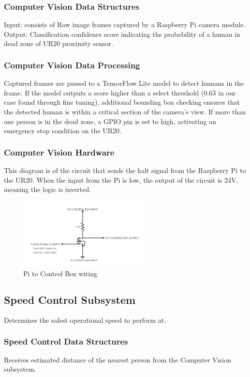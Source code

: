 \subsubsection{Computer Vision Data Structures}
Input: consists of Raw image frames captured by a Raspberry Pi camera module.
Output: Classification confidence score indicating the probability of a human in dead zone of UR20 proximity sensor.

\subsubsection{Computer Vision Data Processing}
Captured frames are passed to a TensorFlow Lite model to detect humans in the frame. If the model outputs a score higher than a select threshold (0.63 in our case found through fine tuning), additional bounding box checking ensures that the detected human is within a critical section of the camera's view. 
If more than one person is in the dead zone, a GPIO pin is set to high, activating an emergency stop condition on the UR20.

\subsubsection{Computer Vision Hardware}
This diagram is of the circuit that sends the halt signal from the Raspberry Pi to the UR20. When the input from the Pi is low, the output of the circuit is 24V, meaning the logic is inverted.
\begin{figure}[h!]
	\centering
 	\includegraphics[width=0.60\textwidth]{images/piCircuit.png}
 \caption{Pi to Control Box wiring}
\end{figure}

\subsection{Speed Control Subsystem}
Determines the safest operational speed to perform at.

\subsubsection{Speed Control Data Structures}
Receives estimated distance of the nearest person from the Computer Vision subsystem.

